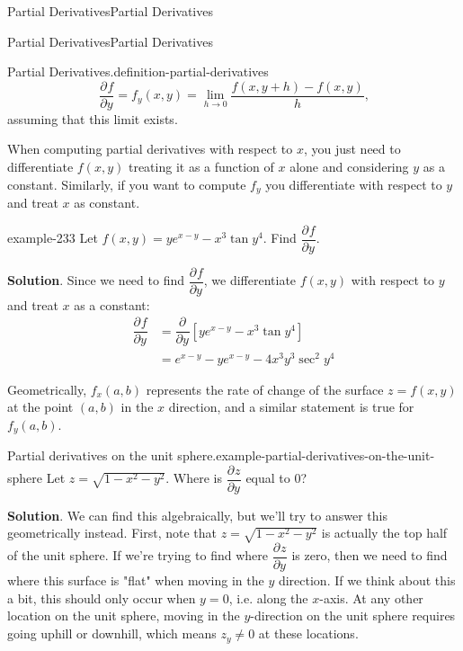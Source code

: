 \documentclass[10pt,]{book}
\numberwithin{equation}{section}
\newcommand{\pdv}[3][]{\dfrac{\partial^{#1} #2}{\partial #3^{#1}}}
\begin{document}
\begin{chapterptx}{Partial Derivatives}{}{Partial Derivatives}{}{}
\begin{sectionptx}{Partial Derivatives}{}{Partial Derivatives}{}{}
\begin{definition}{Partial Derivatives.}{definition-partial-derivatives}
\begin{equation*}
\pdv{f}{y} = f_{y}(x,y) = \lim_{h\to0}\frac{f(x,y+h)-f(x,y)}{h}\text{,}
\end{equation*}
assuming that this limit exists.%
\end{definition}
\hypertarget{p-1138}{}%
When computing partial derivatives with respect to \(x\), you just need to differentiate \(f(x,y)\) treating it as a function of \(x\) alone and considering \(y\) as a constant. Similarly, if you want to compute \(f_{y}\) you differentiate with respect to \(y\) and treat \(x\) as constant.%
\begin{example}{}{example-233}%
\hypertarget{p-1139}{}%
Let \(f(x,y) = ye^{x-y} - x^{3}\tan y^{4}\). Find \(\pdv{f}{y}\).%
\par\smallskip%
\noindent\textbf{Solution}.\hypertarget{solution-175}{}\quad%
\hypertarget{p-1140}{}%
Since we need to find \(\pdv{f}{y}\), we differentiate \(f(x,y)\) with respect to \(y\) and treat \(x\) as a constant:%
\begin{align*}
\pdv{f}{y} & = \pdv{}{y}\left[ye^{x-y} - x^{3}\tan y^{4}\right] \\
& = e^{x-y} - ye^{x-y} - 4x^{3}y^{3}\sec^{2}y^{4} 
\end{align*}
%
\end{example}
\hypertarget{p-1141}{}%
Geometrically, \(f_{x}(a,b)\) represents the rate of change of the surface \(z = f(x,y)\) at the point \((a,b)\) in the \(x\) direction, and a similar statement is true for \(f_{y}(a,b)\).%
\begin{example}{Partial derivatives on the unit sphere.}{example-partial-derivatives-on-the-unit-sphere}%
\hypertarget{p-1142}{}%
Let \(z = \sqrt{1-x^{2} - y^{2}}\). Where is \(\pdv{z}{y}\) equal to \(0\)?%
\par\smallskip%
\noindent\textbf{Solution}.\hypertarget{solution-176}{}\quad%
\hypertarget{p-1143}{}%
We can find this algebraically, but we'll try to answer this geometrically instead. First, note that \(z = \sqrt{1 - x^{2} - y^{2}}\) is actually the top half of the unit sphere. If we're trying to find where \(\pdv{z}{y}\) is zero, then we need to find where this surface is "flat" when moving in the \(y\) direction. If we think about this a bit, this should only occur when \(y=0\), i.e. along the \(x\)-axis. At any other location on the unit sphere, moving in the \(y\)-direction on the unit sphere requires going uphill or downhill, which means \(z_{y}\neq0\) at these locations.%
\end{example}
\hypertarget{p-1144}{}%

\end{sectionptx}
\end{chapterptx}
\end{document}
